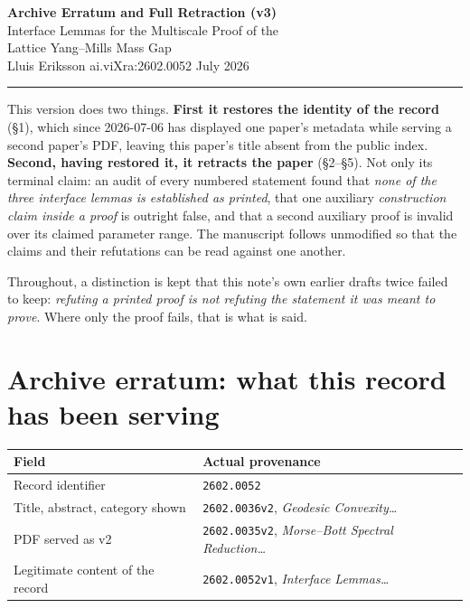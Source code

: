 \documentclass[11pt]{article}
\begin{document}
\begin{center}
{\Large\bfseries Archive Erratum and Full Retraction (v3)}\\[5pt]
{\large Interface Lemmas for the Multiscale Proof of the\\
Lattice Yang--Mills Mass Gap}\\[6pt]
Lluis Eriksson \quad\textbullet\quad ai.viXra:2602.0052 \quad\textbullet\quad July 2026
\end{center}

\noindent\rule{\textwidth}{0.8pt}

\vspace{2pt}
\noindent
This version does two things. \textbf{First it restores the identity of the record}
(\S1), which since 2026-07-06 has displayed one paper's metadata while serving a
second paper's PDF, leaving this paper's title absent from the public index.
\textbf{Second, having restored it, it retracts the paper} (\S2--\S5). Not only its
terminal claim: an audit of every numbered statement found that \emph{none of the
three interface lemmas is established as printed}, that one auxiliary \emph{construction
claim inside a proof} is outright false, and that a second auxiliary proof is invalid
over its claimed parameter range. The manuscript follows unmodified so that the claims
and their refutations can be read against one another.

Throughout, a distinction is kept that this note's own earlier drafts twice failed to
keep: \emph{refuting a printed proof is not refuting the statement it was meant to
prove}. Where only the proof fails, that is what is said.

\section{Archive erratum: what this record has been serving}

\begin{center}
\begin{tabular}{|l|l|}
\hline
\textbf{Field} & \textbf{Actual provenance}\\
\hline
Record identifier & \texttt{2602.0052}\\
\hline
Title, abstract, category shown & \texttt{2602.0036v2}, \emph{Geodesic Convexity\ldots}\\
\hline
PDF served as v2 & \texttt{2602.0035v2}, \emph{Morse--Bott Spectral Reduction\ldots}\\
\hline
Legitimate content of the record & \texttt{2602.0052v1}, \emph{Interface Lemmas\ldots}\\
\hline
\end{tabular}
\end{center}
\end{document}
